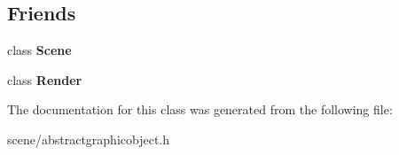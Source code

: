 \subsection*{Friends}
\begin{DoxyCompactItemize}
\item 
\hypertarget{class_tempest_1_1_abstract_scene_object_a032858ae1fe02d2d1170981c2af2d67c}{class {\bfseries Scene}}\label{class_tempest_1_1_abstract_scene_object_a032858ae1fe02d2d1170981c2af2d67c}

\item 
\hypertarget{class_tempest_1_1_abstract_scene_object_ad962652a5ca57a062e87b84d43dad6a3}{class {\bfseries Render}}\label{class_tempest_1_1_abstract_scene_object_ad962652a5ca57a062e87b84d43dad6a3}

\end{DoxyCompactItemize}


The documentation for this class was generated from the following file\+:\begin{DoxyCompactItemize}
\item 
scene/abstractgraphicobject.\+h\end{DoxyCompactItemize}
